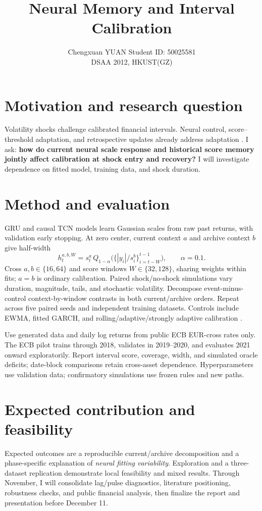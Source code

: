 \documentclass{article}
\title{Neural Memory and Interval Calibration}
\author{Chengxuan YUAN \quad Student ID: 50025581\\DSAA 2012, HKUST(GZ)}
\begin{document}
\maketitle

\section{Motivation and research question}
Volatility shocks challenge calibrated financial intervals. Neural control, score--threshold adaptation, and retrospective updates already address adaptation \citep{ncc,adapt,retro}. I ask: \textbf{how do current neural scale response and historical score memory jointly affect calibration at shock entry and recovery?} I will investigate dependence on fitted model, training data, and shock duration.

\section{Method and evaluation}
GRU and causal TCN models learn Gaussian scales from raw past returns, with validation early stopping. At zero center, current context $a$ and archive context $b$ give half-width
\[
 h_t^{a,b,W}=s_t^a\,Q_{1-\alpha}\bigl(\{|y_i|/s_i^b\}_{i=t-W}^{t-1}\bigr),\qquad \alpha=0.1.
\]
Cross $a,b\in\{16,64\}$ and score windows $W\in\{32,128\}$, sharing weights within fits; $a=b$ is ordinary calibration. Paired shock/no-shock simulations vary duration, magnitude, tails, and stochastic volatility. Decompose event-minus-control context-by-window contrasts in both current/archive orders. Repeat across five paired seeds and independent training datasets. Controls include EWMA, fitted GARCH, and rolling/adaptive/strongly adaptive calibration \citep{saocp}.

Use generated data and daily log returns from public ECB EUR-cross rates only. The ECB pilot trains through 2018, validates in 2019--2020, and evaluates 2021 onward exploratorily. Report interval score, coverage, width, and simulated oracle deficits; date-block comparisons retain cross-asset dependence. Hyperparameters use validation data; confirmatory simulations use frozen rules and new paths.

\section{Expected contribution and feasibility}
Expected outcomes are a reproducible current/archive decomposition and a phase-specific explanation of \emph{neural fitting variability}. Exploration and a three-dataset replication demonstrate local feasibility and mixed results. Through November, I will consolidate lag/pulse diagnostics, literature positioning, robustness checks, and public financial analysis, then finalize the report and presentation before December 11.
\end{document}
